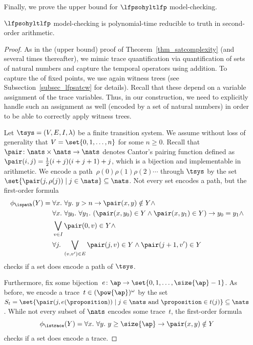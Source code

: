 Finally, we prove the upper bound for $\lfpsohyltlfp$ model-checking.

\begin{lem}
\label{lemma_mc_soaeasy}
$\lfpsohyltlfp$ model-checking is polynomial-time reducible to truth in second-order arithmetic. 
\end{lem}

\begin{proof}
As in the (upper bound) proof of Theorem~\ref{thm_satcomplexity} (and several times thereafter), we mimic trace quantification via quantification of sets of natural numbers and capture the temporal operators using addition. 
To capture the  of fixed points, we use again witness trees (see Subsection~\ref{subsec_lfpsatcw} for details). 
Recall that these depend on a variable assignment of the trace variables. 
Thus, in our construction, we need to explicitly handle such an assignment as well (encoded by a set of natural numbers) in order to be able to correctly apply witness trees.

Let $\tsys = (V,E,I,\lambda)$ be a finite transition system. 
We assume without loss of generality that $V = \set{0,1,\ldots, n}$ for some $n \ge 0$.
Recall that $\pair \colon \nats\times\nats \rightarrow\nats$ denotes Cantor's pairing function defined as $\pair(i,j) = \frac{1}{2}(i+j)(i+j+1) +j$, which is a bijection and implementable in arithmetic.
We encode a path~$\rho(0)\rho(1)\rho(2)\cdots$ through $\tsys$ by the set~$\set{\pair(j,\rho(j)) \mid j \in\nats} \subseteq \nats$.
Not every set encodes a path, but the first-order formula
\begin{align*}
\phi_\ispath(Y) = {}&{} \forall x.\ \forall y.\ y > n \rightarrow \pair(x,y) \notin Y \wedge \\
{}&{} \forall x.\ \forall y_0.\ \forall y_1.\ (\pair(x,y_0) \in Y \wedge
 \pair(x,y_1) \in Y) \rightarrow y_0=y_1  \wedge  \\
{}&{} \bigvee_{v \in I} \pair(0,v) \in Y \wedge \\
{}&{} \forall j.\ \bigvee_{(v,v') \in E} \pair(j,v) \in Y \wedge \pair(j+1,v') \in Y
\end{align*}
checks if a set does encode a path of $\tsys$.

Furthermore, fix some bijection~$e \colon \ap \rightarrow\set{0,1,\ldots,\size{\ap}-1}$.
As before, we encode a trace~$t \in (\pow{\ap})^\omega$ by the set~$S_t =\set{\pair(j,e(\proposition)) \mid j \in \nats \text{ and } \proposition \in t(j)} \subseteq \nats$.
While not every subset of $\nats$ encodes some trace~$t$, the first-order formula 
\[\phi_\istrace(Y) = \forall x.\ \forall y.\ y \ge \size{\ap} \rightarrow \pair(x,y) \notin Y \] checks if a set does encode a trace.


\end{proof}
